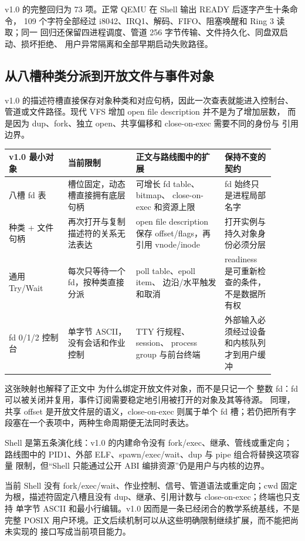 v1.0 的完整回归为 73 项。正常 QEMU 在 Shell 输出 READY 后逐字产生十条命令，
109 个字符全部经过 i8042、IRQ1、解码、FIFO、阻塞唤醒和 Ring 3 读取；同一
回归还保留四进程调度、管道 256 字节传输、文件持久化、同盘双启动、损坏拒绝、
用户异常隔离和全部早期启动失败路径。

\subsection{从八槽种类分派到开放文件与事件对象}

v1.0 的描述符槽直接保存对象种类和对应句柄，因此一次查表就能进入控制台、
管道或文件路径。现代 VFS 增加 open file description 并不是为了增加层数，
而是因为 dup、fork、独立 open、共享偏移和 close-on-exec 需要不同的身份与
引用边界。

\begin{longtable}{|L{0.20\linewidth}|L{0.23\linewidth}|L{0.30\linewidth}|L{0.17\linewidth}|}
\toprule
v1.0 最小对象 & 当前限制 & 正文与路线图中的扩展 & 保持不变的契约 \\
\midrule
\endhead
八槽 fd 表 & 槽位固定，动态槽直接拥有底层句柄 & 可增长 fd table、bitmap、
close-on-exec 和资源上限 & fd 始终只是进程局部名字 \\\tablerowrule
种类 + 文件句柄 & 再次打开与复制描述符的关系无法表达 & open file description
保存 offset/flags，再引用 vnode/inode & 打开实例与持久对象身份必须分层
\\\tablerowrule
通用 Try/Wait & 每次只等待一个 fd，按种类直接分派 & poll table、epoll item、
边沿/水平触发和取消 & readiness 是可重新检查的条件，不是数据所有权 \\\tablerowrule
fd 0/1/2 控制台 & 单字节 ASCII，没有会话和作业控制 & TTY 行规程、session、
process group 与前台终端 & 外部输入必须经过设备和内核队列才到用户缓冲
\\
\bottomrule
\end{longtable}

这张映射也解释了正文中  为什么绑定开放文件对象，而不是只记一个
整数 fd：fd 可以被关闭并复用，事件订阅需要稳定地引用被打开的对象及其等待源。
同理， 共享 offset 是开放文件层的语义，close-on-exec 则属于单个
fd 槽；若仍把所有字段塞在一个表项中，两种生命周期便无法同时表达。

Shell 是第五条演化线：v1.0 的内建命令没有 fork/exec、继承、管线或重定向；
路线图中的 PID1、外部 ELF、spawn/exec/wait、dup 与 pipe 组合将替换这项容量
限制，但“Shell 只能通过公开 ABI 编排资源”仍是用户与内核的边界。

当前 Shell 没有 fork/exec/wait、作业控制、信号、管道语法或重定向；cwd 固定
为根，描述符固定八槽且没有 dup、继承、引用计数与 close-on-exec；终端也只支持
单字节 ASCII 和最小行编辑。v1.0 因而是一条已经闭合的教学系统基线，不是完整
POSIX 用户环境。正文后续机制可以从这些明确限制继续扩展，而不能把尚未实现的
接口写成当前项目能力。
